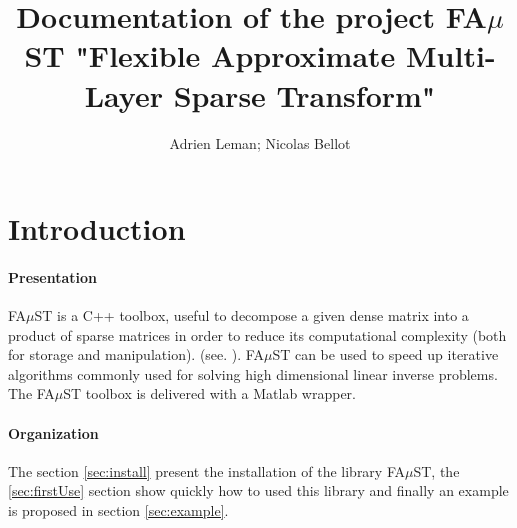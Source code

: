 \documentclass[a4paper,10pt]{article}
\author{Adrien Leman; Nicolas Bellot}
\title{Documentation of the project FA$\mu$ST \smallbreak "Flexible Approximate Multi-Layer Sparse Transform"}
\begin{document}
\maketitle

\tableofcontents

\newpage

\section{Introduction}\label{sec:intro}

\paragraph{Presentation} FA$\mu$ST is a C++ toolbox, useful to decompose a given dense matrix into a product of sparse matrices in order to reduce its computational complexity (both for storage and manipulation). (see. \cite{LeMagoarou2016} ).
FA$\mu$ST can be used to speed up iterative algorithms commonly used for solving high dimensional linear inverse problems.
The FA$\mu$ST toolbox is delivered with a Matlab wrapper. 

\paragraph{Organization} The section \ref{sec:install} present the installation of the library FA$\mu$ST, the \ref{sec:firstUse} section  show quickly how to used this library and finally an example is proposed in section \ref{sec:example}. 











\end{document}
